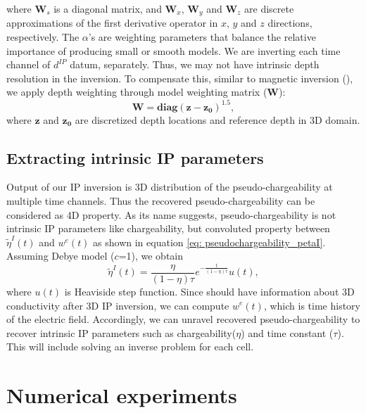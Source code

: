 \documentclass[a4paper, 11pt]{article}
\newcommand{\peta}{\tilde{\eta}}
\newcommand{\dip}{d^{IP}}
\begin{document}
where $\mathbf{W}_s$ is a diagonal matrix, and $\mathbf{W}_x$, $\mathbf{W}_y$ and $\mathbf{W}_z$ are discrete approximations of the first derivative operator in $x$, $y$ and $z$ directions, respectively.  
The $\alpha$'s are weighting parameters that balance the relative importance of producing small or smooth models. We are inverting each time channel of $\dip$ datum, separately. Thus, we may not have intrinsic depth resolution in the inversion. To compensate this, similar to magnetic inversion (\cite{LiMag3D}), we apply depth weighting through model weighting matrix ($\mathbf{W}$):
\begin{equation}
    \mathbf{W} = \mathbf{diag}(\mathbf{z-z_0})^{1.5},
    \label{eq: weight_mat}
\end{equation}
where $\mathbf{z}$ and $\mathbf{z_0}$ are discretized depth locations and reference depth in 3D domain.

\subsection{Extracting intrinsic IP parameters}

Output of our IP inversion is 3D distribution of the pseudo-chargeability at multiple time channels. 
Thus the recovered pseudo-chargeability can be considered as 4D property. 
As its name suggests, pseudo-chargeability is not intrinsic IP parameters like chargeability, but convoluted property between $\peta^{I}(t)$ and $w^{e}(t)$ as shown in equation \ref{eq: pseudochargeability_petaI}. 
Assuming Debye model ($c$=1), we obtain
\begin{equation}
    \peta^{I}(t) = \frac{\eta}{(1-\eta)\tau}e^{-\frac{t}{(1-\eta)\tau}}u(t),
    \label{eq: intrinsic_peta_debye}
\end{equation}
where $u(t)$ is Heaviside step function. 
Since should have information about 3D conductivity after 3D IP inversion, we can compute  $w^e(t)$, which is time history of the electric field. 
Accordingly, we can unravel recovered pseudo-chargeability to recover intrinsic IP parameters such as chargeability($\eta$) and time constant ($\tau$). 
This will include solving an inverse problem for each cell. 


\section{Numerical experiments}
\end{document}
